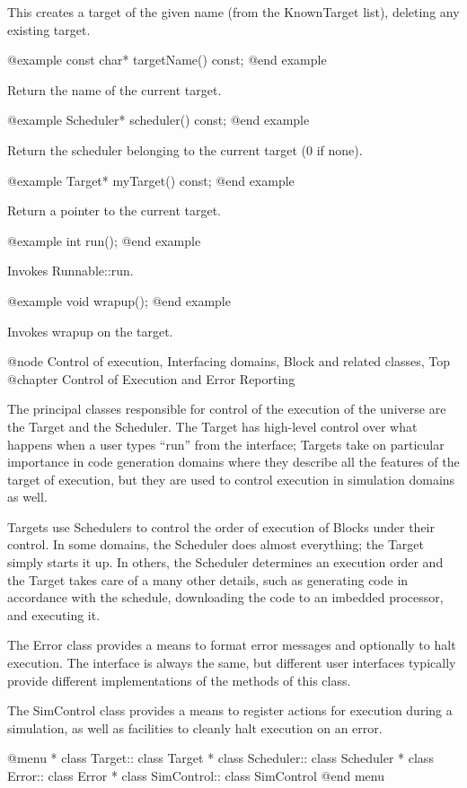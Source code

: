 This creates a target of the given name (from the KnownTarget list),
deleting any existing target.

@example
const char* targetName() const;
@end example

Return the name of the current target.

@example
Scheduler* scheduler() const;
@end example

Return the scheduler belonging to the current target (0 if none).

@example
Target* myTarget() const;
@end example

Return a pointer to the current target.

@example
int run();
@end example

Invokes Runnable::run.

@example
void wrapup();
@end example

Invokes wrapup on the target.

@node Control of execution, Interfacing domains, Block and related classes, Top
@chapter Control of Execution and Error Reporting

The principal classes responsible for control of the execution of the
universe are the Target and the Scheduler.  The Target has high-level
control over what happens when a user types ``run'' from the interface;
Targets take on particular importance in code generation domains where
they describe all the features of the target of execution, but they
are used to control execution in simulation domains as well.

Targets use Schedulers to control the order of execution of Blocks under
their control.  In some domains, the Scheduler does almost everything;
the Target simply starts it up.  In others, the Scheduler determines
an execution order and the Target takes care of a many other
details, such as generating code in accordance with the schedule,
downloading the code to an imbedded processor, and executing it.

The Error class provides a means to format error messages and optionally
to halt execution.  The interface is always the same, but different
user interfaces typically provide different implementations of the
methods of this class.

The SimControl class provides a means to register actions for execution
during a simulation, as well as facilities to cleanly halt execution
on an error.

@menu
* class Target::                class Target
* class Scheduler::             class Scheduler
* class Error::                 class Error
* class SimControl::            class SimControl
@end menu

